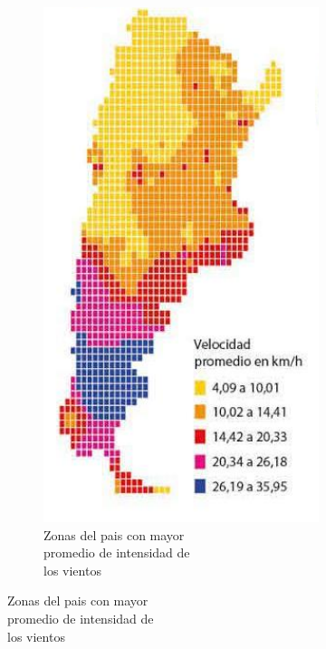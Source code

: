 \begin{figure}[H]
\begin{subfigure}{0.4\textwidth}
\end{subfigure}
\begin{subfigure}{0.4\textwidth}
\includegraphics[width=1\linewidth]{ambiente/Screenshot_2.png}
\caption{Zonas del pais con mayor \\promedio de intensidad de \\los vientos}
\label{fig:subim2}
\end{subfigure}
\label{fig:image2}
\end{figure}

